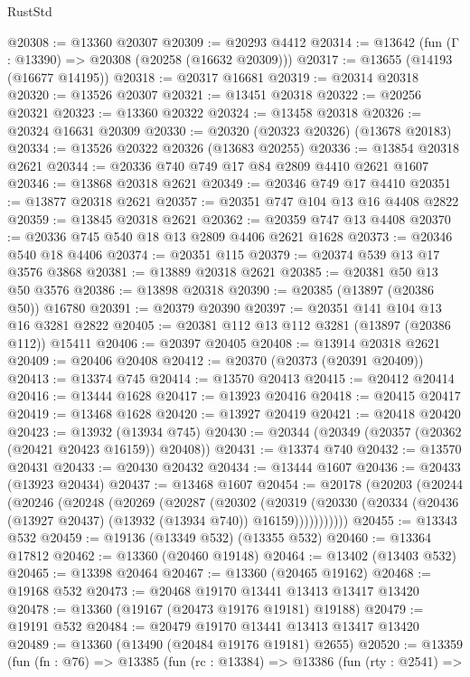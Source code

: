\begin{lexlean}{RustStd}
\begin{coremodule}
@20308 := @13360 @20307
@20309 := @20293 @4412
@20314 := @13642 (fun (Γ : @13390) => @20308 (@20258 (@16632 @20309)))
@20317 := @13655 (@14193 (@16677 @14195))
@20318 := @20317 @16681
@20319 := @20314 @20318
@20320 := @13526 @20307
@20321 := @13451 @20318
@20322 := @20256 @20321
@20323 := @13360 @20322
@20324 := @13458 @20318
@20326 := @20324 @16631 @20309
@20330 := @20320 (@20323 @20326) (@13678 @20183)
@20334 := @13526 @20322 @20326 (@13683 @20255)
@20336 := @13854 @20318 @2621
@20344 := @20336 @740 @749 @17 @84 @2809 @4410 @2621 @1607
@20346 := @13868 @20318 @2621
@20349 := @20346 @749 @17 @4410
@20351 := @13877 @20318 @2621
@20357 := @20351 @747 @104 @13 @16 @4408 @2822
@20359 := @13845 @20318 @2621
@20362 := @20359 @747 @13 @4408
@20370 := @20336 @745 @540 @18 @13 @2809 @4406 @2621 @1628
@20373 := @20346 @540 @18 @4406
@20374 := @20351 @115
@20379 := @20374 @539 @13 @17 @3576 @3868
@20381 := @13889 @20318 @2621
@20385 := @20381 @50 @13 @50 @3576
@20386 := @13898 @20318
@20390 := @20385 (@13897 (@20386 @50)) @16780
@20391 := @20379 @20390
@20397 := @20351 @141 @104 @13 @16 @3281 @2822
@20405 := @20381 @112 @13 @112 @3281 (@13897 (@20386 @112)) @15411
@20406 := @20397 @20405
@20408 := @13914 @20318 @2621
@20409 := @20406 @20408
@20412 := @20370 (@20373 (@20391 @20409))
@20413 := @13374 @745
@20414 := @13570 @20413
@20415 := @20412 @20414
@20416 := @13444 @1628
@20417 := @13923 @20416
@20418 := @20415 @20417
@20419 := @13468 @1628
@20420 := @13927 @20419
@20421 := @20418 @20420
@20423 := @13932 (@13934 @745)
@20430 := @20344 (@20349 (@20357 (@20362 (@20421 @20423 @16159)) @20408))
@20431 := @13374 @740
@20432 := @13570 @20431
@20433 := @20430 @20432
@20434 := @13444 @1607
@20436 := @20433 (@13923 @20434)
@20437 := @13468 @1607
@20454 := @20178
    (@20203
      (@20244
        (@20246
          (@20248
            (@20269
              (@20287
                (@20302
                  (@20319
                    (@20330 (@20334 (@20436 (@13927 @20437) (@13932 (@13934 @740)) @16159)))))))))))
@20455 := @13343 @532
@20459 := @19136 (@13349 @532) (@13355 @532)
@20460 := @13364 @17812
@20462 := @13360 (@20460 @19148)
@20464 := @13402 (@13403 @532)
@20465 := @13398 @20464
@20467 := @13360 (@20465 @19162)
@20468 := @19168 @532
@20473 := @20468 @19170 @13441 @13413 @13417 @13420
@20478 := @13360 (@19167 (@20473 @19176 @19181) @19188)
@20479 := @19191 @532
@20484 := @20479 @19170 @13441 @13413 @13417 @13420
@20489 := @13360 (@13490 (@20484 @19176 @19181) @2655)
@20520 := @13359
    (fun (fn : @76) =>
    @13385
      (fun (rc : @13384) =>
      @13386
        (fun (rty : @2541) =>

\end{coremodule}
\end{lexlean}
